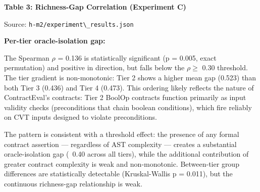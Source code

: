 \textbf{Table 3: Richness-Gap Correlation (Experiment C)}

\begin{table}[htbp]
\centering
{}
\end{table}

Source: \texttt{h-m2/experiment\textbackslash \_results.json}

\textbf{Per-tier oracle-isolation gap:}

\begin{table}[htbp]
\centering
{}
\end{table}

The Spearman $\rho$ = 0.136 is statistically significant (p = 0.005, exact permutation) and positive in direction, but falls below the $\rho \geq$ 0.30 threshold. The tier gradient is non-monotonic: Tier 2 shows a higher mean gap (0.523) than both Tier 3 (0.436) and Tier 4 (0.473). This ordering likely reflects the nature of ContractEval's contracts: Tier 2 BoolOp contracts function primarily as input validity checks (preconditions that chain boolean conditions), which fire reliably on CVT inputs designed to violate preconditions.

The pattern is consistent with a threshold effect: the presence of any formal contract assertion --- regardless of AST complexity --- creates a substantial oracle-isolation gap (~0.40 across all tiers), while the additional contribution of greater contract complexity is weak and non-monotonic. Between-tier group differences are statistically detectable (Kruskal-Wallis p = 0.011), but the continuous richness-gap relationship is weak.

